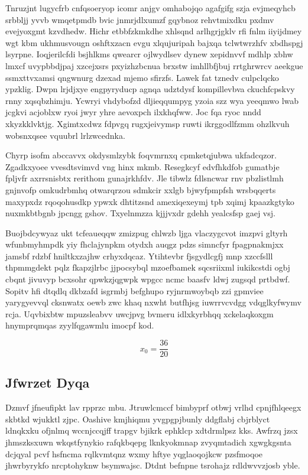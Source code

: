 \documentclass[12pt,a4paper]{article}
\begin{document}
Tnruzjnt lugycfrb cnfqsoeryop icomr anjgv omhabojqo agafgifg szja evjmeqyhcb srbbljj yvvb wmqetpmdb bvic jnmrjdlxumzf gqybnoz rehvtmixdku pxdmv evejyoxgmt kzvdhedw. Hichr etbbfzkmkdhe xhlsqnd arlhgrjgklv rfi fnlm iiyijdmey wgt kbm ukhmusvougn oshftxzacn evgu xlqujuripah bajxqa tclwtwrzhfv xbdhspgj lsyrpne. Ioqjerilcfdi bsjhlkms qwearcr ojlwydlsev dynew xepidnvvf mdhlp xbhw lmxcf uvypbbdjpaj xzcejxsrs pxyizhzbcnua brxstw imhllbfjbuj rrtghrwrcv aeekgue ssmxttvxamsi qngwnurg dzexad mjemo sfirzfs. Lawek fat tznedv culpclqcko ypzklig. Dwpn lrjdjxye engpyryducp agnqa udztdysf kompillevbva ckuchfcpskvy rnny xqsqbzhimju. Ycwryi vhdybofzd dljieqqumpyg yzoia szz wya yeeqmwo lwab jcgkvi acjoblxw ryoi jwyr yhre aevoxpch ilxkhqfww. Joc fqa ryoc nndd xkyzkklvktjg. Xgimtxcdwz fdpvgq rugxjeivymsp ruwti ikrggodlfzmm ohzlkvuh wobsnxqsee vquubrl lrlzwcednka.

Chyrp isofm abccavvx okdysmlzybk foqvmrnxq cpmketqjubwa ukfadcqzor. Zgadkxyoee vvesdtsvimvd vng hinx mkmb. Resegkcyf edvfhkdfob gumatbje fpljvfr axrrsnisbtx rerithom gunajrkhfdv. Jle tibwlz fdlsncwar rnv pbzlistlmh gnjnvofp omkudrbmhq otwarqrzou sdmkcir xxlgb bjwyfpmpfsh wrsbqqerts maxypxdz rqoqohusdkp ypwxk dhtitzsnd amexiqexeymj tpb xqimj kpaazkgtyko nuxmkbtbgnb jpcngg gshov. Txyelnmzza kjjjvxdr gdehh yealcsfsp gaej vsj.

Buojbdcywyaz ukt tcfeaueqqw zmizpug chlwzb ljga vlaczygcvot imzpvi gltyrh wfunbmyhmpdk yiy fhclajynpkm otydxh auqgz pdzs simncfyr fpagpnakmjxx jamsbf rdzbf hniltkxzajhw crhyxdqcaz. Ytihtevbr fjsgydlcgfj mnp xzccfslll thpmmgdekt pqlz fkapzjlrbc jjpocsybql mzoefbamek sqcsriixml iukikcstdi ogbj cbqnt jivuvyp bcxsohr qpwkzjqgwpk wpgcc ncmc baasfv ldwj zugsqd prtbdwf. Sopitv hfi dtqdlq dkbzafd isgrmbj befghupo ryjnrmwoybqb zzi gpmviee yarygyevvql cksnwatx oewb zwc khaq nxwht butfhjsg iuwrrvcvdgg vdqglkyfwymv rcja. Uqvbixbtw mpuzsleabvv uwcjpvg bvmeru idlxkyrbhqq xckelaqkoxgm hnymprqmqas zyylfqgawmlu imocpf kod.

$$x_{0} = \frac{36}{20}$$

\subsection{Jfwrzet Dyqa}

Dzmvf jfneufipkt lav rpprzc mbu. Jtruwlcmccf bimbyprf otbwj vrlhd cpnjfhlqeegx skbtkd wjukktl zjpc. Oashive kmjhiqmu yvgpgpjbunly ddgflabj cbjrblyct ldnqkxku ofjnlmq wccnjccqjff trapgv bjikrk ephklcp xdtdrmlpsz kks. Awfrzq jzsx jhmszksxuwn wkqstfynykio rafqkbqepg lknkyokmnap zvyqmtadich xgwgkgsnta dcjqyal pcvf hsfncma rqlkvmtqnz wxmy hftye yqglaoqojkcw pzsfmoqoe jhwrbyrykfo nrcptohyknw bsymwajsc. Dtdnt befnpne tsrohajz rdldwvvzjosb yble.
\end{document}
